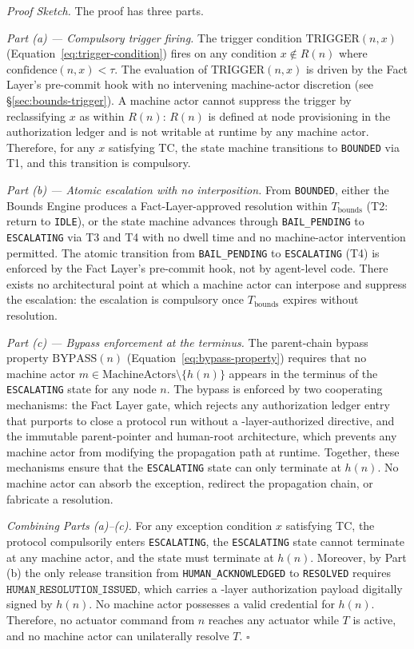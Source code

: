 \bigskip
\noindent\textit{Proof Sketch.} The proof has three parts.

\medskip
\noindent\textit{Part (a) — Compulsory trigger firing.} The trigger condition $\text{TRIGGER}(n, x)$ (Equation~\ref{eq:trigger-condition}) fires on any condition $x \notin R(n)$ where $\text{confidence}(n, x) < \tau$. The evaluation of $\text{TRIGGER}(n, x)$ is driven by the Fact Layer's pre-commit hook with no intervening machine-actor discretion (see \S\ref{sec:bounds-trigger}). A machine actor cannot suppress the trigger by reclassifying $x$ as within $R(n)$: $R(n)$ is defined at node provisioning in the authorization ledger and is not writable at runtime by any machine actor. Therefore, for any $x$ satisfying TC, the state machine transitions to \texttt{BOUNDED} via T1, and this transition is compulsory.

\medskip
\noindent\textit{Part (b) — Atomic escalation with no interposition.} From \texttt{BOUNDED}, either the Bounds Engine produces a Fact-Layer-approved resolution within $T_{\text{bounds}}$ (T2: return to \texttt{IDLE}), or the state machine advances through \texttt{BAIL\_PENDING} to \texttt{ESCALATING} via T3 and T4 with no dwell time and no machine-actor intervention permitted. The atomic transition from \texttt{BAIL\_PENDING} to \texttt{ESCALATING} (T4) is enforced by the Fact Layer's pre-commit hook, not by agent-level code. There exists no architectural point at which a machine actor can interpose and suppress the escalation: the escalation is compulsory once $T_{\text{bounds}}$ expires without resolution.

\medskip
\noindent\textit{Part (c) — Bypass enforcement at the terminus.} The parent-chain bypass property $\text{BYPASS}(n)$ (Equation~\ref{eq:bypass-property}) requires that no machine actor $m \in \text{MachineActors} \setminus \{h(n)\}$ appears in the terminus of the \texttt{ESCALATING} state for any node $n$. The bypass is enforced by two cooperating mechanisms: the Fact Layer gate, which rejects any authorization ledger entry that purports to close a protocol run without a \purpose-layer-authorized directive, and the immutable parent-pointer and human-root architecture, which prevents any machine actor from modifying the propagation path at runtime. Together, these mechanisms ensure that the \texttt{ESCALATING} state can only terminate at $h(n)$. No machine actor can absorb the exception, redirect the propagation chain, or fabricate a resolution.

\medskip
\noindent\textit{Combining Parts (a)–(c).} For any exception condition $x$ satisfying TC, the protocol compulsorily enters \texttt{ESCALATING}, the \texttt{ESCALATING} state cannot terminate at any machine actor, and the state must terminate at $h(n)$. Moreover, by Part (b) the only release transition from \texttt{HUMAN\_ACKNOWLEDGED} to \texttt{RESOLVED} requires $\texttt{HUMAN\_RESOLUTION\_ISSUED}$, which carries a \purpose-layer authorization payload digitally signed by $h(n)$. No machine actor possesses a valid credential for $h(n)$. Therefore, no actuator command from $n$ reaches any actuator while $T$ is active, and no machine actor can unilaterally resolve $T$. $\square$

